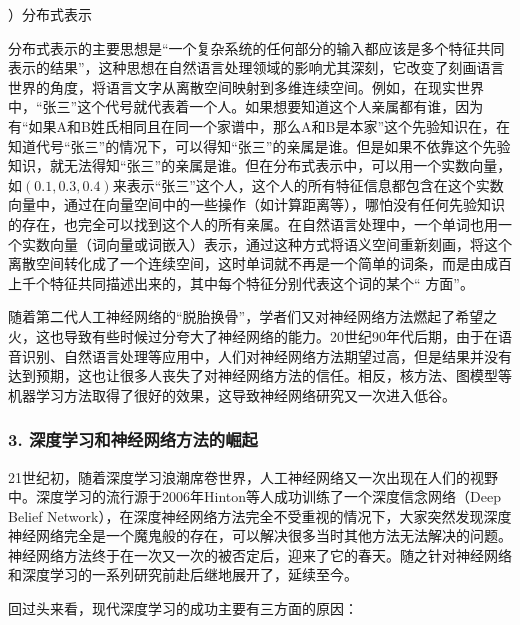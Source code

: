 \vspace{0.3em}
）分布式表示
\vspace{0.3em}

\parinterval 分布式表示的主要思想是“一个复杂系统的任何部分的输入都应该是多个特征共同表示的结果”，这种思想在自然语言处理领域的影响尤其深刻，它改变了刻画语言世界的角度，将语言文字从离散空间映射到多维连续空间。例如，在现实世界中，“张三”这个代号就代表着一个人。如果想要知道这个人亲属都有谁，因为有“如果A和B姓氏相同且在同一个家谱中，那么A和B是本家”这个先验知识在，在知道代号“张三”的情况下，可以得知“张三”的亲属是谁。但是如果不依靠这个先验知识，就无法得知“张三”的亲属是谁。但在分布式表示中，可以用一个实数向量，如$ (0.1,0.3,0.4) $来表示“张三”这个人，这个人的所有特征信息都包含在这个实数向量中，通过在向量空间中的一些操作（如计算距离等），哪怕没有任何先验知识的存在，也完全可以找到这个人的所有亲属。在自然语言处理中，一个单词也用一个实数向量（词向量或词嵌入）表示，通过这种方式将语义空间重新刻画，将这个离散空间转化成了一个连续空间，这时单词就不再是一个简单的词条，而是由成百上千个特征共同描述出来的，其中每个特征分别代表这个词的某个“ 方面”。

\parinterval 随着第二代人工神经网络的“脱胎换骨”，学者们又对神经网络方法燃起了希望之火，这也导致有些时候过分夸大了神经网络的能力。20世纪90年代后期，由于在语音识别、自然语言处理等应用中，人们对神经网络方法期望过高，但是结果并没有达到预期，这也让很多人丧失了对神经网络方法的信任。相反，核方法、图模型等机器学习方法取得了很好的效果，这导致神经网络研究又一次进入低谷。


\subsubsection{3. 深度学习和神经网络方法的崛起}

\parinterval 21世纪初，随着深度学习浪潮席卷世界，人工神经网络又一次出现在人们的视野中。深度学习的流行源于2006年Hinton等人成功训练了一个深度信念网络（Deep Belief Network），在深度神经网络方法完全不受重视的情况下，大家突然发现深度神经网络完全是一个魔鬼般的存在，可以解决很多当时其他方法无法解决的问题。神经网络方法终于在一次又一次的被否定后，迎来了它的春天。随之针对神经网络和深度学习的一系列研究前赴后继地展开了，延续至今。

\parinterval 回过头来看，现代深度学习的成功主要有三方面的原因：

